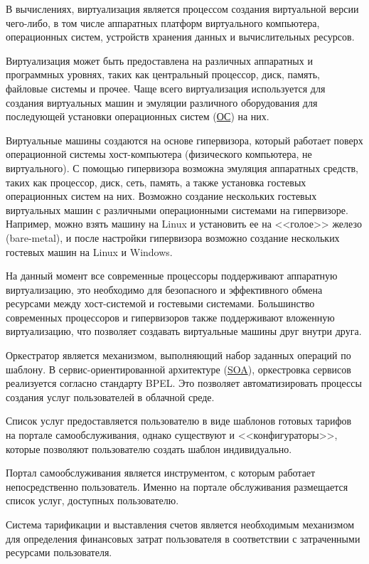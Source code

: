 В вычислениях, виртуализация является процессом создания виртуальной версии чего-либо, в том числе аппаратных платформ виртуального компьютера, операционных систем, устройств хранения данных и вычислительных ресурсов.

Виртуализация может быть предоставлена на различных аппаратных и программных уровнях, таких как центральный процессор, диск, память, файловые системы и прочее.
Чаще всего виртуализация используется для создания виртуальных машин и эмуляции различного оборудования для последующей установки операционных систем (\hyperlink{os}{ОС}) на них.

Виртуальные машины создаются на основе гипервизора, который работает поверх операционной системы хост-компьютера (физического компьютера, не виртуального).
С помощью гипервизора возможна эмуляция аппаратных средств, таких как процессор, диск, сеть, память, а также установка гостевых операционных систем на них.
Возможно создание нескольких гостевых виртуальных машин с различными операционными системами на гипервизоре.
Например, можно взять машину на Linux и установить ее на <<голое>> железо (bare-metal), и после настройки гипервизора возможно создание нескольких гостевых машин на Linux и Windows.

На данный момент все современные процессоры поддерживают аппаратную виртуализацию, это необходимо для безопасного и эффективного обмена ресурсами между хост-системой и гостевыми системами.
Большинство современных процессоров и гипервизоров также поддерживают вложенную виртуализацию, что позволяет создавать виртуальные машины друг внутри друга.

Оркестратор является механизмом, выполняющий набор заданных операций по шаблону.
В сервис-ориентированной архитектуре (\hyperlink{soa}{SOA}), оркестровка сервисов реализуется согласно стандарту BPEL.
Это позволяет автоматизировать процессы создания услуг пользователей в облачной среде.

Список услуг предоставляется пользователю в виде шаблонов готовых тарифов на портале самообслуживания, однако существуют и <<конфигураторы>>, которые позволяют пользователю создать шаблон индивидуально.

Портал самообслуживания является инструментом, с которым работает непосредственно пользователь.
Именно на портале обслуживания размещается список услуг, доступных пользователю.

Система тарификации и выставления счетов является необходимым механизмом для определения финансовых затрат пользователя в соответствии с затраченными ресурсами пользователя.

